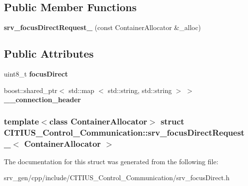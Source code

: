 \subsection*{\-Public \-Member \-Functions}
\begin{DoxyCompactItemize}
\item 
\hypertarget{struct_c_i_t_i_u_s___control___communication_1_1srv__focus_direct_request___a66d8b89c933703467eeae29501545611}{{\bfseries srv\-\_\-focus\-Direct\-Request\-\_\-} (const \-Container\-Allocator \&\-\_\-alloc)}\label{struct_c_i_t_i_u_s___control___communication_1_1srv__focus_direct_request___a66d8b89c933703467eeae29501545611}

\end{DoxyCompactItemize}
\subsection*{\-Public \-Attributes}
\begin{DoxyCompactItemize}
\item 
\hypertarget{struct_c_i_t_i_u_s___control___communication_1_1srv__focus_direct_request___aa0745e4073fc784e8a1512c7be3d15e0}{uint8\-\_\-t {\bfseries focus\-Direct}}\label{struct_c_i_t_i_u_s___control___communication_1_1srv__focus_direct_request___aa0745e4073fc784e8a1512c7be3d15e0}

\item 
\hypertarget{struct_c_i_t_i_u_s___control___communication_1_1srv__focus_direct_request___a8d74713c568ff5c1d642d07009466d65}{boost\-::shared\-\_\-ptr$<$ std\-::map\*
$<$ std\-::string, std\-::string $>$ $>$ {\bfseries \-\_\-\-\_\-connection\-\_\-header}}\label{struct_c_i_t_i_u_s___control___communication_1_1srv__focus_direct_request___a8d74713c568ff5c1d642d07009466d65}

\end{DoxyCompactItemize}
\subsubsection*{template$<$class Container\-Allocator$>$ struct C\-I\-T\-I\-U\-S\-\_\-\-Control\-\_\-\-Communication\-::srv\-\_\-focus\-Direct\-Request\-\_\-$<$ Container\-Allocator $>$}



\-The documentation for this struct was generated from the following file\-:\begin{DoxyCompactItemize}
\item 
srv\-\_\-gen/cpp/include/\-C\-I\-T\-I\-U\-S\-\_\-\-Control\-\_\-\-Communication/srv\-\_\-focus\-Direct.\-h\end{DoxyCompactItemize}
